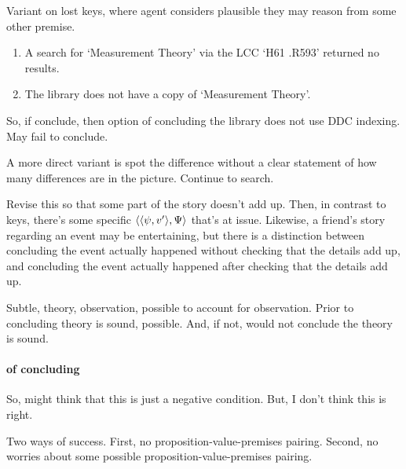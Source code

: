 \begin{note}
  Variant on lost keys, where agent considers plausible they may reason from some other premise.
  {
    \color{red}
    \begin{illustration}
      \begin{enumerate}
      \item
        A search for `Measurement Theory' via the LCC `H61 .R593' returned no results.
      \item
        The library does not have a copy of `Measurement Theory'.
      \end{enumerate}
    \end{illustration}

    So, if conclude, then option of concluding the library does not use DDC indexing.
    May fail to conclude.
  }

  A more direct variant is spot the difference without a clear statement of how many differences are in the picture.
  Continue to search.


  \begin{illustration}[Anecdotes]
    {
      \color{red}
      Revise this so that some part of the story doesn't add up.
      Then, in contrast to keys, there's some specific \(\langle \langle \psi, v' \rangle, \Psi \rangle\) that's at issue.
    }
    Likewise, a friend's story regarding an event may be entertaining, but there is a distinction between concluding the event actually happened without checking that the details add up, and concluding the event actually happened after checking that the details add up.
  \end{illustration}

  Subtle, theory, observation, possible to account for observation.
  Prior to concluding theory is sound, possible.
  And, if not, would not conclude the theory is sound.
\end{note}


\paragraph{ of concluding}

\begin{note}
  \color{red}
  So, might think that this is just a negative condition.
  But, I don't think this is right.

  Two ways of success.
  First, no proposition-value-premises pairing.
  Second, no worries about some possible proposition-value-premises pairing.
\end{note}

